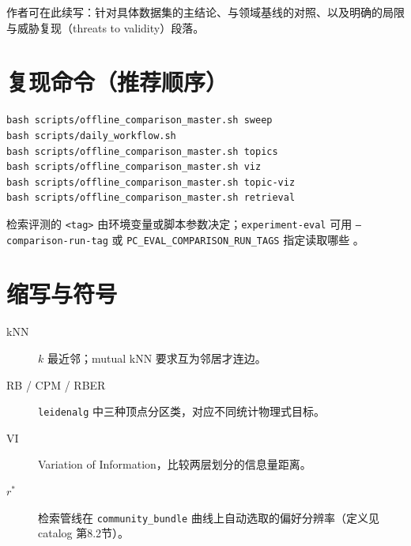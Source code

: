 \documentclass[UTF8,a4paper,11pt,fontset=fandol]{ctexart}
\begin{document}
作者可在此续写：针对具体数据集的主结论、与领域基线的对照、以及明确的局限与威胁复现（threats to validity）段落。

\appendix

\section{复现命令（推荐顺序）}
\begin{verbatim}
bash scripts/offline_comparison_master.sh sweep
bash scripts/daily_workflow.sh
bash scripts/offline_comparison_master.sh topics
bash scripts/offline_comparison_master.sh viz
bash scripts/offline_comparison_master.sh topic-viz
bash scripts/offline_comparison_master.sh retrieval
\end{verbatim}

检索评测的 \texttt{<tag>} 由环境变量或脚本参数决定；\texttt{experiment-eval} 可用 \texttt{--comparison-run-tag} 或 \texttt{PC\_EVAL\_COMPARISON\_RUN\_TAGS} 指定读取哪些 。

\section{缩写与符号}
\begin{description}
  \item[kNN] $k$ 最近邻；mutual kNN 要求互为邻居才连边。
  \item[RB / CPM / RBER] \texttt{leidenalg} 中三种顶点分区类，对应不同统计物理式目标。
  \item[VI] Variation of Information，比较两层划分的信息量距离。
  \item[$r^\ast$] 检索管线在 \texttt{community\_bundle} 曲线上自动选取的偏好分辨率（定义见 catalog 第8.2节）。
\end{description}
\end{document}
